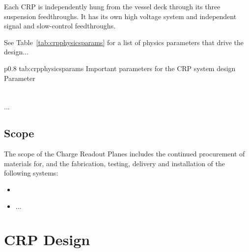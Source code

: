 Each CRP is independently hung from the vessel deck through its three
suspension feedthroughs. It has its own high voltage system and 
independent signal and slow-control feedthroughs.


See Table~\ref{tab:crpphysicsparams} for a list of physics parameters that drive the design...

\begin{dunetable}
{p{0.8\textwidth}}
{tab:crpphysicsparams}
{Important parameters for the CRP system design}   
Parameter \\ \toprowrule
  \\ \colhline
   \\ \colhline
 ...\\ 
\end{dunetable}



\subsection{Scope}
\label{sec:fddp-crp-scope}

The scope of the Charge Readout Planes includes the continued procurement of materials for, and the fabrication, testing, delivery and installation of the following systems: 


\begin{itemize}
\item  
\item  ...
\end{itemize}



\section{CRP Design}
\label{sec:fddp-crp-design}



